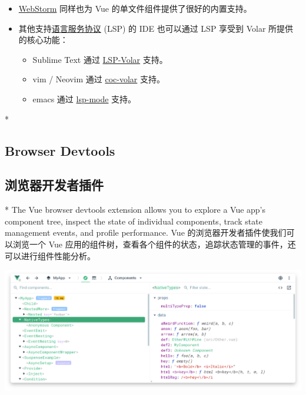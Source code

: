 \begin{paracol}{2}
\begin{itemize}
  支持，以及模板内表达式与组件 props 的智能提示。\begin{vueQuote}{TIP}
    Volar 取代了我们之前为 Vue 2 提供的官方 VSCode 扩展
    \href{https://marketplace.visualstudio.com/items?itemName=octref.vetur}{Vetur}。如果你之前已经安装了
    Vetur，请确保在 Vue 3 的项目中禁用它。
  \end{vueQuote} 
  \item
    \href{https://www.jetbrains.com/webstorm/}{WebStorm} 同样也为 Vue
    的单文件组件提供了很好的内置支持。
  \item
    其他支持\href{https://microsoft.github.io/language-server-protocol/}{语言服务协议}
    (LSP) 的 IDE 也可以通过 LSP 享受到 Volar 所提供的核心功能：
    \begin{itemize}
    \item
      Sublime Text 通过
      \href{https://github.com/sublimelsp/LSP-volar}{LSP-Volar} 支持。
    \item
      vim / Neovim 通过
      \href{https://github.com/yaegassy/coc-volar}{coc-volar} 支持。
    \item
      emacs 通过
      \href{https://emacs-lsp.github.io/lsp-mode/page/lsp-volar/}{lsp-mode}
      支持。
    \end{itemize}
  \end{itemize}
\end{paracol}

\begin{paracol}{2}
 
\switchcolumn[0]*%
\subsection{Browser Devtools}
\switchcolumn
\subsection{浏览器开发者插件}
\switchcolumn[0]*%
The Vue browser devtools extension allows you to explore a Vue app's
component tree, inspect the state of individual components, track state
management events, and profile performance.
\switchcolumn
Vue 的浏览器开发者插件使我们可以浏览一个 Vue
应用的组件树，查看各个组件的状态，追踪状态管理的事件，还可以进行组件性能分析。
\end{paracol}

\begin{center} 
\includegraphics{./img/screenshot-shadow.png} 
\end{center}
    

